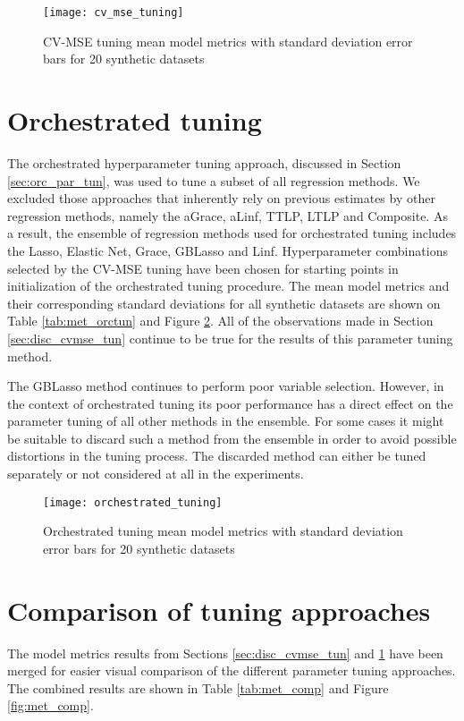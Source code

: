 
\begin{figure}[H]
	\centering
	\texttt{[image: cv\_mse\_tuning]}
	\caption{CV-MSE tuning mean model metrics with standard deviation error bars for 20 synthetic datasets}
	\label{fig:met_cvmse}
\end{figure}

\section{Orchestrated tuning} \label{sec:disc_orc_tun}
The orchestrated hyperparameter tuning approach, discussed in Section \ref{sec:orc_par_tun}, was used to tune a subset of all regression methods. We excluded those approaches that inherently rely on previous estimates by other regression methods, namely the aGrace, aLinf, TTLP, LTLP and Composite. As a result, the ensemble of regression methods used for orchestrated tuning includes the Lasso, Elastic Net, Grace, GBLasso and Linf. Hyperparameter combinations selected by the CV-MSE tuning have been chosen for starting points in initialization of the orchestrated tuning procedure. The mean model metrics and their corresponding standard deviations for all synthetic datasets are shown on Table \ref{tab:met_orctun} and Figure \ref{fig:met_orchestrated}. All of the observations made in Section \ref{sec:disc_cvmse_tun} continue to be true for the results of this parameter tuning method. 

The GBLasso method continues to perform poor variable selection. However, in the context of orchestrated tuning its poor performance has a direct effect on the parameter tuning of all other methods in the ensemble. For some cases it might be suitable to discard such a method from the ensemble in order to avoid possible distortions in the tuning process. The discarded method can either be tuned separately or not considered at all in the experiments.

\begin{figure}[H]
	\centering
	\texttt{[image: orchestrated\_tuning]}
	\caption{Orchestrated tuning mean model metrics with standard deviation error bars for 20 synthetic datasets}
	\label{fig:met_orchestrated}
\end{figure}


\section{Comparison of tuning approaches}
The model metrics results from Sections \ref{sec:disc_cvmse_tun} and \ref{sec:disc_orc_tun} have been merged for easier visual comparison of the different parameter tuning approaches. The combined results are shown in Table \ref{tab:met_comp} and Figure \ref{fig:met_comp}.

